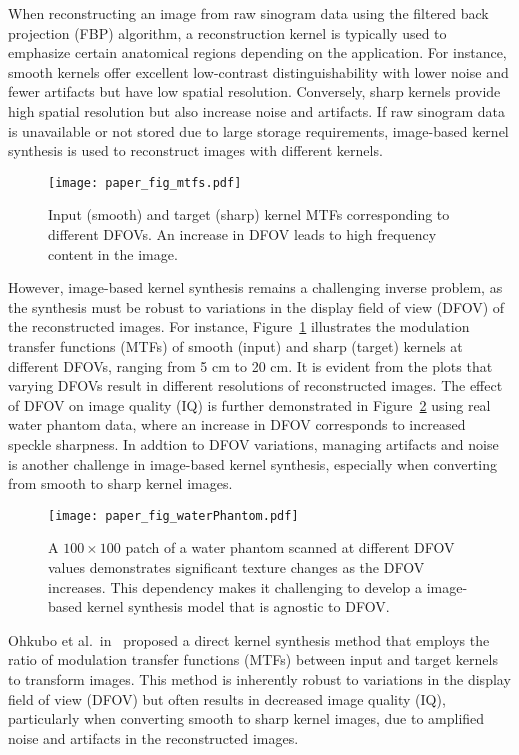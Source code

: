 \documentclass{article}
\begin{document}
When reconstructing an image from raw sinogram data using the filtered back projection (FBP) algorithm, a reconstruction kernel is typically used to emphasize certain anatomical regions depending on the application. For instance, smooth kernels offer excellent low-contrast distinguishability with lower noise and fewer artifacts but have low spatial resolution. Conversely, sharp kernels provide high spatial resolution but also increase noise and artifacts. If raw sinogram data is unavailable or not stored due to large storage requirements, image-based kernel synthesis is used to reconstruct images with different kernels.
\begin{figure}
	\centering
	\texttt{[image: paper\_fig\_mtfs.pdf]}	
	\caption{Input (smooth) and target (sharp) kernel MTFs corresponding to different DFOVs. An increase in DFOV leads to high frequency content in the image. }
	\label{fig:mtfs}
\end{figure}
However, image-based kernel synthesis remains a challenging inverse problem, as the synthesis must be robust to variations in the display field of view (DFOV) of the reconstructed images. For instance, Figure~\ref{fig:mtfs} illustrates the modulation transfer functions (MTFs) of smooth (input) and sharp (target) kernels at different DFOVs, ranging from 5 cm to 20 cm. It is evident from the plots that varying DFOVs result in different resolutions of reconstructed images. The effect of DFOV on image quality (IQ) is further demonstrated in Figure~\ref{fig:wp} using real water phantom data, where an increase in DFOV corresponds to increased speckle sharpness. In addtion to DFOV variations, managing artifacts and noise is another challenge in image-based kernel synthesis, especially when converting from smooth to sharp kernel images.
\begin{figure}
	\centering
	\texttt{[image: paper\_fig\_waterPhantom.pdf]}	
	\caption{ A $100 \times 100$ patch of a water phantom scanned at different DFOV values demonstrates significant texture changes as the DFOV increases. This dependency makes it challenging to develop a image-based kernel synthesis model that is agnostic to DFOV. }
	\label{fig:wp}
\end{figure} 
Ohkubo et al.~in~\cite{ohkubo2011image} proposed a direct kernel synthesis method that employs the ratio of modulation transfer functions (MTFs) between input and target kernels to transform images. This method is inherently robust to variations in the display field of view (DFOV) but often results in decreased image quality (IQ), particularly when converting smooth to sharp kernel images, due to amplified noise and artifacts in the reconstructed images.
\end{document}
